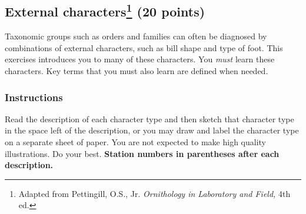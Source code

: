 \documentclass[10pt]{article}
\begin{document}
\thispagestyle{plain}

\subsection*{External characters\footnote{Adapted from Pettingill, O.S., Jr. \textit{Ornithology in Laboratory and Field,} 4th ed.} (20 points)}

Taxonomic groups such as orders and families can often be diagnosed by combinations of external characters, such as bill shape and type of foot.  This exercises introduces you to many of these characters. You \emph{must} learn these characters. Key terms that you must also learn are defined when needed.

\subsubsection*{Instructions}

 Read the description of each character type and then sketch that character type in the space left of the description, or you may draw and label the character type on a separate sheet of paper. %
 You are not expected to make high quality illustrations. Do your best. \textbf{Station numbers in parentheses after each description.}
 
 
 
 

\end{document}
